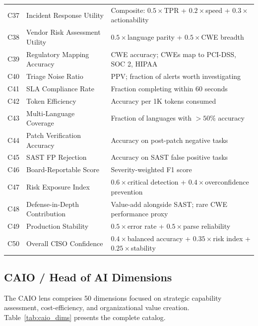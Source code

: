 \documentclass[10pt,twocolumn]{article}
\begin{document}
\begin{table}[t]
\begin{tabular}{@{}r l p{7.5cm}@{}}
C37 & Incident Response Utility           & Composite: $0.5{\times}$TPR + $0.2{\times}$speed + $0.3{\times}$actionability \\
C38 & Vendor Risk Assessment Utility      & $0.5{\times}$language parity + $0.5{\times}$CWE breadth \\
C39 & Regulatory Mapping Accuracy         & CWE accuracy; CWEs map to PCI-DSS, SOC 2, HIPAA \\
C40 & Triage Noise Ratio                  & PPV; fraction of alerts worth investigating \\
C41 & SLA Compliance Rate                 & Fraction completing within 60 seconds \\
C42 & Token Efficiency                    & Accuracy per 1K tokens consumed \\
C43 & Multi-Language Coverage             & Fraction of languages with ${>}50\%$ accuracy \\
C44 & Patch Verification Accuracy         & Accuracy on post-patch negative tasks \\
C45 & SAST FP Rejection                   & Accuracy on SAST false positive tasks \\
C46 & Board-Reportable Score              & Severity-weighted F1 score \\
C47 & Risk Exposure Index                 & $0.6{\times}$critical detection + $0.4{\times}$overconfidence prevention \\
C48 & Defense-in-Depth Contribution       & Value-add alongside SAST; rare CWE performance proxy \\
C49 & Production Stability                & $0.5{\times}$error rate + $0.5{\times}$parse reliability \\
C50 & Overall CISO Confidence             & $0.4{\times}$balanced accuracy + $0.35{\times}$risk index + $0.25{\times}$stability \\
\bottomrule
\end{tabular}
\end{table}

\subsection{CAIO / Head of AI Dimensions}
\label{sec:caio_dims}

The CAIO lens comprises 50 dimensions focused on strategic capability assessment, cost-efficiency, and organizational value creation. Table~\ref{tab:caio_dims} presents the complete catalog.
\end{document}
